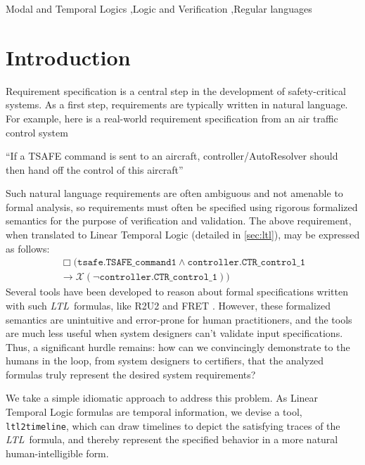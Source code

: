 \documentclass[preprint,12pt]{elsarticle}
\theoremstyle{definition}
\theoremstyle{remark}
\newcommand{\always}{\Box}
\newcommand{\nextt}{\mathcal{X}}
\newcommand{\limplies}{\rightarrow}
\newcommand{\ltl}{\textit{LTL}}
\newcommand{\tool}{\hspace{0.1cm}\texttt{ltl2timeline}\hspace{0.1cm}}
\begin{document}
\begin{frontmatter}
    \begin{keyword}
        Modal and Temporal Logics
        \sep Logic and Verification
        \sep Regular languages
    \end{keyword}
\end{frontmatter}
\section{Introduction}

Requirement specification is a central step in the development of safety-critical systems. As a first step, requirements are typically written in natural language. For example, here is a real-world requirement specification from an air traffic control system ~\cite{ZR14}
\begin{center}
    ``If a TSAFE command is sent to an aircraft, controller/AutoResolver should then hand off the control of this aircraft''
\end{center}
Such natural language requirements are often ambiguous and not amenable to formal analysis, so requirements must often be specified using rigorous formalized semantics for the purpose of verification and validation. The above requirement, when translated to Linear Temporal Logic (detailed in \cref{sec:ltl}), may be expressed as follows:
\begin{align*}
    \always (\texttt{tsafe.TSAFE\_command1} \land \texttt{controller.CTR\_control\_1} \\
    \limplies \nextt (\neg \texttt{controller.CTR\_control\_1}))
\end{align*}
Several tools have been developed to reason about formal specifications written with such \ltl\ formulas, like R2U2 and FRET \cite{GPMS20}. However, these formalized semantics are unintuitive and error-prone for human practitioners, and the tools are much less useful when system designers can't validate input specifications.
Thus, a significant hurdle remains: how can we convincingly demonstrate to the humans in the loop, from system designers to certifiers, that the analyzed formulas truly represent the desired system requirements? %

We take a simple idiomatic approach to address this problem. As Linear Temporal Logic formulas are temporal information, we devise a tool, \tool, which can draw timelines to depict the satisfying traces of the \ltl\ formula, and thereby represent the specified behavior in a more natural human-intelligible form.
\end{document}

